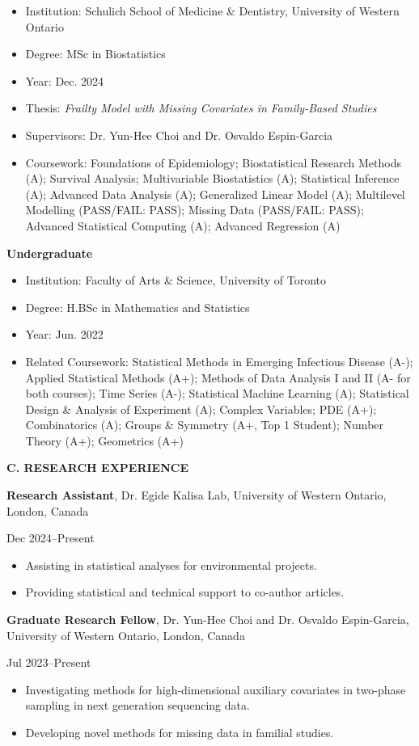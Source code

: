 \documentclass[10pt]{article}
\newcommand{\cvsection}[1]{%
  \Needspace{5\baselineskip}%
  \vspace{0.65em}%
  {\large\bfseries\color{sectiongray} #1}\par
  \vspace{0.18em}%
}
\newcommand{\cvsubsection}[1]{%
  \Needspace{4\baselineskip}%
  \vspace{0.3em}%
  {\bfseries #1}\par
}
\newcommand{\cvdated}[2]{%
  \noindent
  \begin{minipage}[t]{\dimexpr\linewidth-1.35in\relax}
    \raggedright\strut #1\strut
  \end{minipage}%
  \hfill
  \begin{minipage}[t]{1.18in}
    \raggedleft\strut{\color{dategray} #2}%
  \end{minipage}\par
}
\newenvironment{cvdetailitems}{%
  \begin{itemize}[leftmargin=1.6em,label=--,topsep=0.06em,itemsep=0.12em,parsep=0pt,partopsep=0pt,after=\vspace{0.08em}]
}{%
  \end{itemize}%
}
\newcommand{\cvresearchentry}[2]{%
  \Needspace{5\baselineskip}%
  \cvdated{#1}{#2}%
}
\begin{document}
\begin{itemize}[leftmargin=1.6em,label=--]
\item Institution: Schulich School of Medicine \& Dentistry, University of Western Ontario
\item Degree: MSc in Biostatistics
\item Year: Dec. 2024
\item Thesis: \emph{Frailty Model with Missing Covariates in Family-Based Studies}
\item Supervisors: Dr. Yun-Hee Choi and Dr. Osvaldo Espin-Garcia
\item Coursework: Foundations of Epidemiology; Biostatistical Research Methods (A); Survival Analysis; Multivariable Biostatistics (A); Statistical Inference (A); Advanced Data Analysis (A); Generalized Linear Model (A); Multilevel Modelling (PASS/FAIL: PASS); Missing Data (PASS/FAIL: PASS); Advanced Statistical Computing (A); Advanced Regression (A)
\end{itemize}

\cvsubsection{Undergraduate}
\begin{itemize}[leftmargin=1.6em,label=--]
\item Institution: Faculty of Arts \& Science, University of Toronto
\item Degree: H.BSc in Mathematics and Statistics
\item Year: Jun. 2022
\item Related Coursework: Statistical Methods in Emerging Infectious Disease (A-); Applied Statistical Methods (A+); Methods of Data Analysis I and II (A- for both courses); Time Series (A-); Statistical Machine Learning (A); Statistical Design \& Analysis of Experiment (A); Complex Variables; PDE (A+); Combinatorics (A); Groups \& Symmetry (A+, Top 1 Student); Number Theory (A+); Geometrics (A+)
\end{itemize}

\cvsection{C. RESEARCH EXPERIENCE}

\cvresearchentry{\textbf{Research Assistant}, Dr. Egide Kalisa Lab, University of Western Ontario, London, Canada}{Dec 2024--Present}
\begin{cvdetailitems}
\item Assisting in statistical analyses for environmental projects.
\item Providing statistical and technical support to co-author articles.
\end{cvdetailitems}

\cvresearchentry{\textbf{Graduate Research Fellow}, Dr. Yun-Hee Choi and Dr. Osvaldo Espin-Garcia, University of Western Ontario, London, Canada}{Jul 2023--Present}
\begin{cvdetailitems}
\item Investigating methods for high-dimensional auxiliary covariates in two-phase sampling in next generation sequencing data.
\item Developing novel methods for missing data in familial studies.
\end{cvdetailitems}
\end{document}

